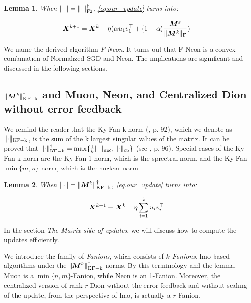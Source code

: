 \documentclass{article} %
\newtheorem{lemma}{Lemma}
\newcommand{\norm}[1]{\lVert #1\rVert}
\DeclarePairedDelimiter{\normf}{\|}{\|_\mathrm{F}}
\DeclarePairedDelimiter{\normkfk}{\|}{\|_\mathrm{KF-k}}
\DeclarePairedDelimiter{\normftwo}{\|}{\|_\mathrm{F2}}
\DeclarePairedDelimiter{\norms}{\|}{\|_{\mathrm{op}}}
\DeclarePairedDelimiter{\normn}{\|}{\|_{\mathrm{nuc}}}
\begin{document}
    \begin{lemma}\label{lemma:nsgd_neon_update}    
        When $\norm{\cdot} = \normftwo{\cdot}^\dagger$, \cref{eq:our_update} turns into:

        \begin{equation}\label{eq:nsgd_neon_update}
            \mX^{k+1} = \mX^{k} - \eta (\alpha u_1 v_1^\top + (1-\alpha)\frac{\mM^k}{\normf{\mM^k}})
        \end{equation}
    \end{lemma}

        We name the derived algorithm \emph{F-Neon}. It turns out that F-Neon is a convex combination of Normalized SGD and Neon. The implications are significant and discussed in the following sections.

    
    \subsection{\texorpdfstring{$\normkfk{\mM^k}^\dagger$ and Muon, Neon, and Centralized Dion without error feedback}{Muon, Neon, and Centralized Dion without error feedback}}
        We remind the reader that the Ky Fan k-norm (\cite{bhatia2013matrix}, p. 92), which we denote as $\normkfk{\cdot}$, is the sum of the k largest singular values of the matrix. It can be proved that $\normkfk{\cdot}^\dagger = \max\{\frac{1}{k} \normn{\cdot}, \norms{\cdot}\}$ (see \cite{bhatia2013matrix}, p. 96). Special cases of the Ky Fan k-norm are the Ky Fan 1-norm, which is the sprectral norm, and the Ky Fan $\min\{m, n\}$-norm, which is the nuclear norm.

        \begin{lemma}\label{lemma:ky_fan_update}    
            When $\norm{\cdot} = \normkfk{\mM^k}^\dagger$, \cref{eq:our_update} turns into:
    
            \begin{equation}\label{eq:ky_fan_update}
                {\bm{X}}^{k+1} = {\bm{X}}^{k} - \eta \sum_{i=1}^{k}u_i v_i^\top
            \end{equation}
        \end{lemma}
        In the section {\it The Matrix side of updates}, we will discuss how to compute the updates efficiently.

        We introduce the family of {\it Fanions}, which consists of {\it $k$-Fanions}, lmo-based algorithms under the $\normkfk{\mM^k}^\dagger$ norms. By this terminology and the lemma, Muon is a $\min\{n,m\}$-Fanion, while Neon is an 1-Fanion. Moreover, the centralized version of rank-$r$ Dion \cite{ahn2025dioncommunicationefficientoptimizerlarge} without the error feedback and without scaling of the update, from the perspective of lmo, is actually a $r$-Fanion.      
        
\end{document}
